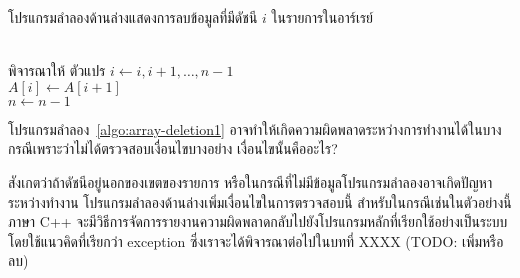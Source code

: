 โปรแกรม{\wbr}ลำ{\wbr}ลอง{\wbr}ด้าน{\wbr}ล่าง{\wbr}แสดง{\wbr}การ{\wbr}ลบ{\wbr}ข้อมูล{\wbr}ที่{\wbr}มี{\wbr}ดัชนี $i$ ใน{\wbr}รายการ{\wbr}ใน{\wbr}อาร์เรย์

\begin{algt}
\label{algo:array-deletion1}
\\
\hspace*{0.2in} พิจารณา{\wbr}ให้ ตัวแปร $i\leftarrow i,i+1,\ldots,n-1$\\
\hspace*{0.2in}\hspace*{0.2in} $A[i]\leftarrow A[i+1]$\\
\hspace*{0.2in} $n\leftarrow n-1$
\end{algt}

\begin{quiz}{}
โปรแกรม{\wbr}ลำ{\wbr}ลอง~\ref{algo:array-deletion1}
อาจ{\wbr}ทำ{\wbr}ให้{\wbr}เกิด{\wbr}ความผิด{\wbr}พลาด{\wbr}ระหว่าง{\wbr}การ{\wbr}ทำงาน{\wbr}ได้{\wbr}ใน{\wbr}บาง{\wbr}กรณี{\wbr}เพราะว่า{\wbr}ไม่{\wbr}ได้{\wbr}ตรวจสอบ{\wbr}เงื่อนไข{\wbr}บาง{\wbr}อย่าง{\wbr}
เงื่อนไข{\wbr}นั้น{\wbr}คือ{\wbr}อะไร?
\end{quiz}

สังเกต{\wbr}ว่า{\wbr}ถ้า{\wbr}ดัชนี{\wbr}อยู่{\wbr}นอก{\wbr}ของ{\wbr}เขต{\wbr}ของ{\wbr}รายการ{\wbr}
หรือ{\wbr}ใน{\wbr}กรณี{\wbr}ที่{\wbr}ไม่{\wbr}มี{\wbr}ข้อมูล{\wbr}โปรแกรม{\wbr}ลำ{\wbr}ลอง{\wbr}อาจ{\wbr}เกิด{\wbr}ปัญหา{\wbr}ระหว่าง{\wbr}ทำงาน{\wbr}
โปรแกรม{\wbr}ลำ{\wbr}ลอง{\wbr}ด้าน{\wbr}ล่าง{\wbr}เพิ่ม{\wbr}เงื่อนไข{\wbr}ใน{\wbr}การ{\wbr}ตรวจสอบ{\wbr}นี้ สำหรับ{\wbr}ใน{\wbr}กรณี{\wbr}เช่น{\wbr}ใน{\wbr}ตัวอย่าง{\wbr}นี้ ภาษา{\wbr}
C++ จะ{\wbr}มี{\wbr}วิธีการ{\wbr}จัดการ{\wbr}รายงาน{\wbr}ความผิด{\wbr}พลาด{\wbr}กลับ{\wbr}ไป{\wbr}ยัง{\wbr}โปรแกรมหลัก{\wbr}ที่{\wbr}เรียก{\wbr}ใช้{\wbr}อย่าง{\wbr}เป็น{\wbr}ระบบ{\wbr}
โดย{\wbr}ใช้{\wbr}แนว{\wbr}คิด{\wbr}ที่{\wbr}เรียก{\wbr}ว่า exception ซึ่ง{\wbr}เรา{\wbr}จะ{\wbr}ได้{\wbr}พิจารณา{\wbr}ต่อไป{\wbr}ใน{\wbr}บท{\wbr}ที่ XXXX (TODO:
เพิ่ม{\wbr}หรือ{\wbr}ลบ)


